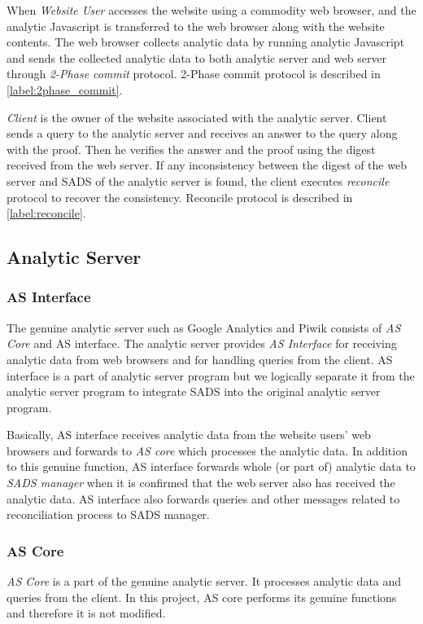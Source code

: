 When \emph{Website User} accesses the website using a commodity web browser, and the analytic Javascript is transferred to the web browser along with the website contents.
The web browser collects analytic data by running analytic Javascript and sends the collected analytic data to both analytic server and web server through \emph{2-Phase commit} protocol. 
2-Phase commit protocol is described in \ref{label:2phase_commit}.

\emph{Client} is the owner of the website associated with the analytic server. 
Client sends a query to the analytic server and receives an answer to the query along with the proof. 
Then he verifies the answer and the proof using the digest received from the web server. 
If any inconsistency between the digest of the web server and SADS of the analytic server is found, the client executes \emph{reconcile} protocol to recover the consistency.
Reconcile protocol is described in \ref{label:reconcile}.

\subsection{Analytic Server}
\subsubsection{AS Interface}
\label{subsub:as_interface}
The genuine analytic server such as Google Analytics and Piwik consists of \emph{AS Core} and AS interface.
The analytic server provides \emph{AS Interface} for receiving analytic data from web browsers and for handling queries from the client.
AS interface is a part of analytic server program but we logically separate it from the analytic server program to integrate SADS into the original analytic server program. 

Basically, AS interface receives analytic data from the website users' web browsers and forwards to \emph{AS core} which processes the analytic data. 
In addition to this genuine function, AS interface forwards whole (or part of) analytic data to \emph{SADS manager} when it is confirmed that the web server also has received the analytic data. 
AS interface also forwards queries and other messages related to reconciliation process to SADS manager. 

\subsubsection{AS Core}
\emph{AS Core} is a part of the genuine analytic server. 
It processes analytic data and queries from the client. 
In this project, AS core performs its genuine functions and therefore it is not modified. 


